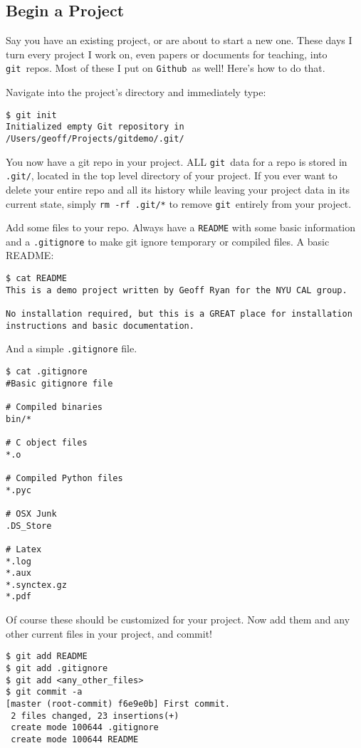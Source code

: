 \documentclass[14pt]{amsart}
\newcommand{\git}{{\texttt{git}}}
\newcommand{\github}{{\texttt{Github}}}
\begin{document}
\subsection{Begin a Project}

Say you have an existing project, or are about to start a new one.  These days I turn every project I work on, even papers or documents for teaching, into \git\ repos.  Most of these I put on \github\ as well!  Here's how to do that.

Navigate into the project's directory and immediately type:
\begin{lstlisting}
$ git init
Initialized empty Git repository in /Users/geoff/Projects/gitdemo/.git/
\end{lstlisting}
You now have a git repo in your project.  ALL \git\ data for a repo is stored in \texttt{.git/}, located in the top level directory of your project.  If you ever want to delete your entire repo and all its history while leaving your project data in its current state, simply \texttt{rm -rf .git/*} to remove \git\ entirely from your project.

Add some files to your repo. Always have a \texttt{README} with some basic information and a \texttt{.gitignore} to make git ignore temporary or compiled files.  A basic README:
\begin{lstlisting}
$ cat README
This is a demo project written by Geoff Ryan for the NYU CAL group.

No installation required, but this is a GREAT place for installation
instructions and basic documentation.
\end{lstlisting}

And a simple \texttt{.gitignore} file.

\begin{lstlisting}
$ cat .gitignore
#Basic gitignore file

# Compiled binaries
bin/*

# C object files
*.o

# Compiled Python files
*.pyc

# OSX Junk
.DS_Store

# Latex
*.log
*.aux
*.synctex.gz
*.pdf
\end{lstlisting}

Of course these should be customized for your project.  Now add them and any other current files in your project, and commit!

\begin{lstlisting}
$ git add README
$ git add .gitignore
$ git add <any_other_files>
$ git commit -a
[master (root-commit) f6e9e0b] First commit.
 2 files changed, 23 insertions(+)
 create mode 100644 .gitignore
 create mode 100644 README
\end{lstlisting}
\end{document}

